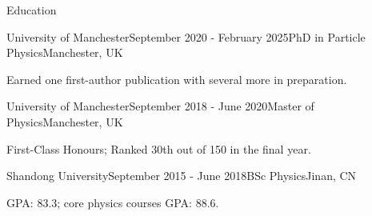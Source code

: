 \documentclass[11pt]{resume} %
\begin{document}
    \begin{rSection}{Education}
        \begin{rSubsection}{University of Manchester}{September 2020 - February 2025}{PhD in Particle Physics}{Manchester, UK}
            \item Earned one first-author publication with several more in preparation.
        \end{rSubsection}
        \begin{rSubsection}{University of Manchester}{September 2018 - June 2020}{Master of Physics}{Manchester, UK}
            \item First-Class Honours; Ranked 30th out of 150 in the final year.
        \end{rSubsection}
        \begin{rSubsection}{Shandong University}{September 2015 - June 2018}{BSc Physics}{Jinan, CN}
            \item GPA: 83.3; core physics courses GPA: 88.6.
        \end{rSubsection}
    \end{rSection}
\end{document}
